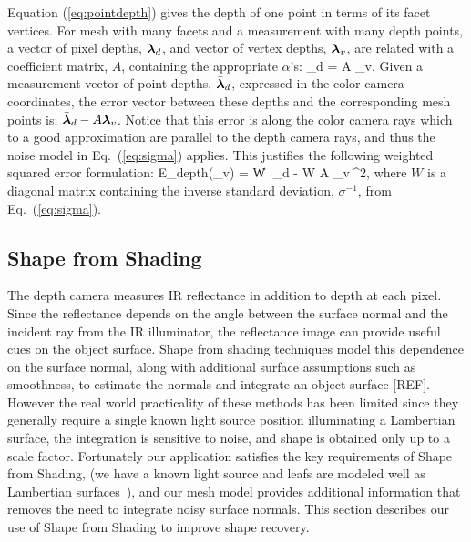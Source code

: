 Equation (\ref{eq:pointdepth}) gives the depth of one point in terms of its facet vertices.  For mesh with many facets and a measurement with many depth points, a vector of pixel depths, $\boldsymbol{\lambda}_d$, and vector of vertex depths, $\boldsymbol{\lambda}_v$, are related with a coefficient matrix, $A$, containing the appropriate $\alpha$'s:
\beq
\vlambda_d = A \vlambda_v. \label{eq:linearmesh}
\eeq
Given a measurement vector of point depths, $\bar{\boldsymbol{\lambda}}_d$, expressed in the color camera coordinates, the error vector between these depths and the corresponding mesh points is: $\bar{\boldsymbol{\lambda}}_d - A \boldsymbol{\lambda}_v$.  Notice that this error is along the color camera rays which to a good approximation are parallel to the depth camera rays, and thus the noise model in Eq.~(\ref{eq:sigma}) applies.  This justifies the following weighted squared error formulation:
\beq
E_{depth}(\vlambda_v) = \| W \bar{\vlambda}_d - W A \vlambda_v \|^2, \label{eq:meshleastsquares}
\eeq
where $W$ is a diagonal matrix containing the inverse standard deviation, $\sigma^{-1}$, from Eq.~(\ref{eq:sigma}).

\subsection{Shape from Shading}

The depth camera measures IR reflectance in addition to depth at each pixel.  Since the reflectance depends on the angle between the surface normal and the incident ray from the IR illuminator, the reflectance image can provide useful cues on the object surface.  Shape from shading techniques model this dependence on the surface normal, along with additional surface assumptions such as smoothness, to estimate the normals and integrate an object surface [REF].  However the real world practicality of these methods has been limited since they generally require a single known light source position illuminating a Lambertian surface, the integration is sensitive to noise, and shape is obtained only up to a scale factor.  Fortunately our application satisfies the key requirements of Shape from Shading, (we have a known light source and leafs are modeled well as Lambertian surfaces~\cite{Chelle2006219}), and our mesh model provides additional information that removes the need to integrate noisy surface normals.  This section describes our use of Shape from Shading to improve shape recovery.

